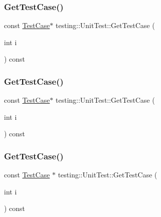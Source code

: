 \mbox{\label{classtesting_1_1_unit_test_adf55eb1cc81a43d40ddef75fadded1de}} 
\subsubsection{\texorpdfstring{GetTestCase()}{GetTestCase()}\hspace{0.1cm}{\footnotesize\ttfamily [1/3]}}
{\footnotesize\ttfamily const \mbox{\hyperlink{classtesting_1_1_test_case}{Test\+Case}}$\ast$ testing\+::\+Unit\+Test\+::\+Get\+Test\+Case (\begin{DoxyParamCaption}\item[{int}]{i }\end{DoxyParamCaption}) const}

\mbox{\label{classtesting_1_1_unit_test_adf55eb1cc81a43d40ddef75fadded1de}} 
\subsubsection{\texorpdfstring{GetTestCase()}{GetTestCase()}\hspace{0.1cm}{\footnotesize\ttfamily [2/3]}}
{\footnotesize\ttfamily const \mbox{\hyperlink{classtesting_1_1_test_case}{Test\+Case}}$\ast$ testing\+::\+Unit\+Test\+::\+Get\+Test\+Case (\begin{DoxyParamCaption}\item[{int}]{i }\end{DoxyParamCaption}) const}

\mbox{\label{classtesting_1_1_unit_test_a724d4c8be4481e0c1523a22b72dc7dac}} 
\subsubsection{\texorpdfstring{GetTestCase()}{GetTestCase()}\hspace{0.1cm}{\footnotesize\ttfamily [3/3]}}
{\footnotesize\ttfamily const \mbox{\hyperlink{classtesting_1_1_test_case}{Test\+Case}} $\ast$ testing\+::\+Unit\+Test\+::\+Get\+Test\+Case (\begin{DoxyParamCaption}\item[{int}]{i }\end{DoxyParamCaption}) const}

